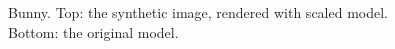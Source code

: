 \documentclass[10pt,twocolumn,letterpaper]{article}
\begin{document}
\begin{figure}[t]
\begin{center}
   \quad
\end{center}
   \caption{Bunny. Top: the synthetic image, rendered with scaled model. Bottom: the original model.}
\label{fig:bunnymodel}
\end{figure}
\end{document}
